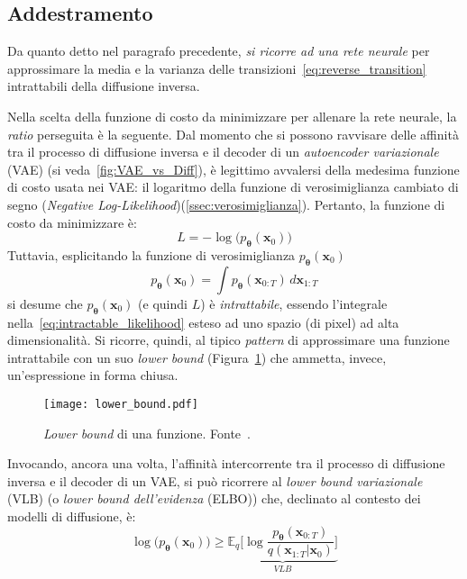 \subsection{Addestramento}


Da quanto detto nel paragrafo precedente, \emph{si ricorre ad una rete neurale} 
per approssimare la media e la varianza delle transizioni~\eqref{eq:reverse_transition} intrattabili della diffusione inversa.


\noindent Nella scelta della funzione di costo da minimizzare per allenare la rete neurale, la \emph{ratio} perseguita è la seguente.
Dal momento che si possono ravvisare delle affinità tra il processo di diffusione inversa e il 
decoder di un \emph{autoencoder variazionale} (VAE) (si veda~\ref{fig:VAE_vs_Diff}), è 
legittimo avvalersi della medesima funzione di costo usata nei VAE: 
il logaritmo della funzione di verosimiglianza cambiato di segno (\emph{Negative Log-Likelihood})(\ref{ssec:verosimiglianza}).
Pertanto, la funzione di costo da minimizzare è:
\begin{equation}
 L=-\log\bigl(p_{\bm{\theta}}(\mathbf{x}_0)\bigr)
\end{equation}
Tuttavia, esplicitando la funzione di verosimiglianza $p_{\bm{\theta}}(\mathbf{x}_0)$
\begin{equation}
 p_{\bm{\theta}}(\mathbf{x}_0)=\int p_{\bm{\theta}}(\mathbf{x}_{0:T}) \,d\mathbf{x}_{1:T} \label{eq:intractable_likelihood}
\end{equation}
si desume che $p_{\bm{\theta}}(\mathbf{x}_0)$ (e quindi $L$) è \emph{intrattabile}, essendo 
l'integrale nella~\eqref{eq:intractable_likelihood} esteso ad uno spazio (di pixel) ad alta dimensionalità.
Si ricorre, quindi, al tipico \emph{pattern} di approssimare una funzione intrattabile con un suo \emph{lower bound} 
(Figura~\ref{fig:vlb}) che ammetta, invece, un'espressione in forma chiusa.
\begin{figure}
    \centering
    \texttt{[image: lower\_bound.pdf]}
    \caption{\emph{Lower bound} di una funzione. Fonte~\cite{royBeginnerGuideDiffusion}.} 
    \label{fig:vlb}
\end{figure}
Invocando, ancora una volta, l'affinità intercorrente tra il processo di diffusione inversa e il decoder 
di un VAE, si può ricorrere al \emph{lower bound variazionale} (VLB) (o \emph{lower bound dell'evidenza} (ELBO)) che, 
declinato al contesto dei modelli di diffusione, è:
\begin{equation}
    \log \bigl(p_{\bm{\theta}}(\mathbf{x}_0)\bigr)\geq\underbrace{\mathbb{E}_q\biggl[\log\frac{p_{\bm{\theta}}(\mathbf{x}_{0:T})}{q(\mathbf{x}_{1:T}|\mathbf{x}_0)}\biggr]}_{VLB}
\end{equation}
